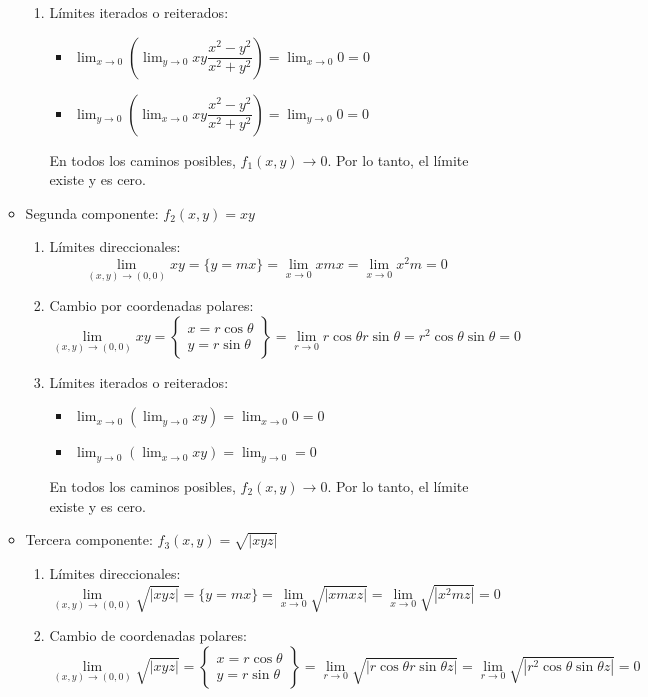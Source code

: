 \begin{enumerate}[label=\color{red}\textbf{\arabic*)}, leftmargin=*]
\begin{itemize}
\begin{enumerate}[label=\arabic*)]
\item Límites iterados o reiterados:
\begin{itemize}
\item $\lim_{ x \to 0 }\left( \lim_{ y \to 0 }xy\dfrac{x^{2}-y^{2}}{x^{2}+y^{2}} \right)=\lim_{ x \to 0 }0=0$
\item $\lim_{ y \to 0 }\left( \lim_{ x \to 0 }xy\dfrac{x^{2}-y^{2}}{x^{2}+y^{2}} \right)=\lim_{ y \to 0 }0=0$
\end{itemize}
En todos los caminos posibles, $f_{1}(x,y)\to 0$. Por lo tanto, el límite existe y es cero.
\end{enumerate}
\item Segunda componente: $f_{2}(x,y)=xy$
\begin{enumerate}[label=\arabic*)]
\item Límites direccionales: $$
\lim_{ (x,y) \to (0,0) }xy=\{ y=mx \}=\lim_{ x \to 0 }xmx=\lim_{ x \to 0 }x^{2}m=0
$$
\item Cambio por coordenadas polares: $$
\lim_{ (x,y) \to (0,0) }xy=\left\{ \begin{array}{l}
x=r\cos\theta \\
y=r\sin\theta
\end{array} \right\}=\lim_{ r \to 0 }r\cos\theta r\sin\theta=r^{2}\cos\theta \sin\theta=0
$$
\item Límites iterados o reiterados:
\begin{itemize}
\item $\lim_{ x \to 0 }\left( \lim_{ y \to 0 }xy \right)=\lim_{ x \to 0 }0=0$
\item $\lim_{ y \to 0 }\left( \lim_{ x \to 0 }xy \right)=\lim_{ y \to 0 }=0$
\end{itemize}
En todos los caminos posibles, $f_{2}(x,y)\to 0$. Por lo tanto, el límite existe y es cero.
\end{enumerate}
\item Tercera componente: $f_{3}(x,y)=\sqrt{ |xyz| }$
\begin{enumerate}
\item Límites direccionales:
$$
\lim_{ (x,y) \to (0,0) }\sqrt{ |xyz| }=\{ y=mx \}=\lim_{ x \to 0 }\sqrt{ |xmxz| }=\lim_{ x \to 0 }\sqrt{ |x^{2}mz| }=0
$$
\item Cambio de coordenadas polares:
$$
\lim_{ (x,y) \to (0,0) }\sqrt{ |xyz| }=\left\{ \begin{array}{l}
x=r\cos\theta \\
y=r\sin\theta
\end{array} \right\}=\lim_{ r \to 0 }\sqrt{ |r\cos\theta r\sin\theta z| }=\lim_{ r \to 0 }\sqrt{ |r^{2}\cos\theta \sin\theta z| }=0
$$
\end{enumerate}
\end{itemize}
\end{enumerate}
